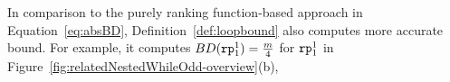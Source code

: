 In comparison to the purely ranking function-based approach in Equation~\ref{eq:absBD}, Definition~\ref{def:loopbound}
also computes more accurate bound. For example, it computes $BD(\mathtt{rp}_1^1) = \frac{m}{4}$ for $\mathtt{rp}_1^1$ in Figure~\ref{fig:relatedNestedWhileOdd-overview}(b), 

